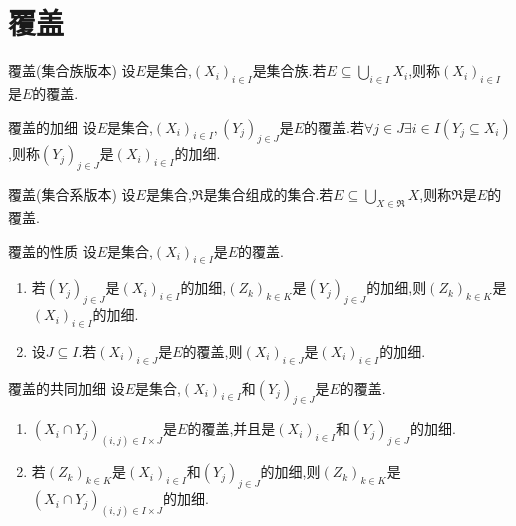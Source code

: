 \section{覆盖}

\begin{definition}{覆盖(集合族版本)}{}
	设$E$是集合,$\left(X_{i}\right)_{i\in I}$是集合族.若$E\subseteq\bigcup\limits_{i\in I}X_{i}$,则称$\left(X_{i}\right)_{i\in I}$是$E$的覆盖.
\end{definition}

\begin{definition}{覆盖的加细}{}
	设$E$是集合,$\left(X_{i}\right)_{i\in I},\left(Y_{j}\right)_{j\in J}$是$E$的覆盖.若$\forall j\in J\exists i\in I\left(Y_{j}\subseteq X_{i}\right)$,则称$\left(Y_{j}\right)_{j\in J}$是$\left(X_{i}\right)_{i\in I}$的加细.
\end{definition}

\begin{definition}{覆盖(集合系版本)}{}
	设$E$是集合,$\mathfrak{R}$是集合组成的集合.若$E\subseteq\bigcup\limits_{X\in\mathfrak{R}}X$,则称$\mathfrak{R}$是$E$的覆盖.
\end{definition}

\begin{proposition}{覆盖的性质}{}
	设$E$是集合,$\left(X_{i}\right)_{i\in I}$是$E$的覆盖.
	\begin{enumerate}
		\item 若$\left(Y_{j}\right)_{j\in J}$是$\left(X_{i}\right)_{i\in I}$的加细,$\left(Z_{k}\right)_{k\in K}$是$\left(Y_{j}\right)_{j\in J}$的加细,则$\left(Z_{k}\right)_{k\in K}$是$\left(X_{i}\right)_{i\in I}$的加细.
		\item 设$J\subseteq I$.若$\left(X_{i}\right)_{i\in J}$是$E$的覆盖,则$\left(X_{i}\right)_{i\in J}$是$\left(X_{i}\right)_{i\in I}$的加细.
	\end{enumerate}
\end{proposition}

\begin{proposition}{覆盖的共同加细}{}
	设$E$是集合,$\left(X_{i}\right)_{i\in I}$和$\left(Y_{j}\right)_{j\in J}$是$E$的覆盖.
	\begin{enumerate}
		\item $\left(X_{i}\cap Y_{j}\right)_{\left(i,j\right)\in I\times J}$是$E$的覆盖,并且是$\left(X_{i}\right)_{i\in I}$和$\left(Y_{j}\right)_{j\in J}$的加细.
		\item 若$\left(Z_{k}\right)_{k\in K}$是$\left(X_{i}\right)_{i\in I}$和$\left(Y_{j}\right)_{j\in J}$的加细,则$\left(Z_{k}\right)_{k\in K}$是$\left(X_{i}\cap Y_{j}\right)_{\left(i,j\right)\in I\times J}$的加细.
	\end{enumerate}
\end{proposition}

